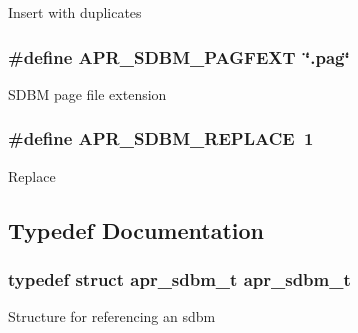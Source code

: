 Insert with duplicates \hypertarget{group___a_p_r___util___d_b_m___s_d_b_m_gaa03fa1d1183240ca0845c54cc07df557}{
\subsubsection[{A\-P\-R\-\_\-\-S\-D\-B\-M\-\_\-\-P\-A\-G\-F\-E\-X\-T}]{\setlength{\rightskip}{0pt plus 5cm}\#define A\-P\-R\-\_\-\-S\-D\-B\-M\-\_\-\-P\-A\-G\-F\-E\-X\-T~\char`\"{}.pag\char`\"{}}}\label{group___a_p_r___util___d_b_m___s_d_b_m_gaa03fa1d1183240ca0845c54cc07df557}
S\-D\-B\-M page file extension \hypertarget{group___a_p_r___util___d_b_m___s_d_b_m_ga84e2252c9ddf5e6c64ed1be43d2d0e53}{
\subsubsection[{A\-P\-R\-\_\-\-S\-D\-B\-M\-\_\-\-R\-E\-P\-L\-A\-C\-E}]{\setlength{\rightskip}{0pt plus 5cm}\#define A\-P\-R\-\_\-\-S\-D\-B\-M\-\_\-\-R\-E\-P\-L\-A\-C\-E~1}}\label{group___a_p_r___util___d_b_m___s_d_b_m_ga84e2252c9ddf5e6c64ed1be43d2d0e53}
Replace 

\subsection{Typedef Documentation}
\hypertarget{group___a_p_r___util___d_b_m___s_d_b_m_gaf24cdea6e4884036a40484259efa68c6}{
\subsubsection[{apr\-\_\-sdbm\-\_\-t}]{\setlength{\rightskip}{0pt plus 5cm}typedef struct {\bf apr\-\_\-sdbm\-\_\-t} {\bf apr\-\_\-sdbm\-\_\-t}}}\label{group___a_p_r___util___d_b_m___s_d_b_m_gaf24cdea6e4884036a40484259efa68c6}
Structure for referencing an sdbm 

